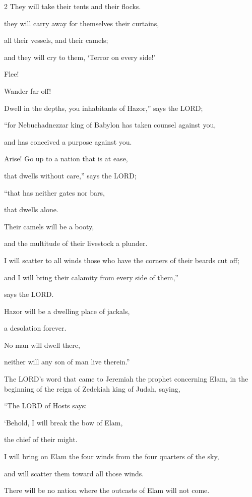\begin{multicols}{2}
\myverse{}They will take their tents and their flocks.

they will carry away for themselves their curtains,

all their vessels, and their camels;

and they will cry to them, ‘Terror on every side!’


\myverse{}Flee!

Wander far off!

Dwell in the depths, you inhabitants of Hazor,” says the LORD;

“for Nebuchadnezzar king of Babylon has taken counsel against you,

and has conceived a purpose against you.


\myverse{}Arise! Go up to a nation that is at ease,

that dwells without care,” says the LORD;

“that has neither gates nor bars,

that dwells alone.


\myverse{}Their camels will be a booty,

and the multitude of their livestock a plunder.

I will scatter to all winds those who have the corners of their beards cut off;

and I will bring their calamity from every side of them,”

says the LORD.


\myverse{}Hazor will be a dwelling place of jackals,

a desolation forever.

No man will dwell there,

neither will any son of man live therein.”

\vspace{\baselineskip}

\myverse{}The LORD’s word that came to Jeremiah the prophet concerning
Elam, in the beginning of the reign of Zedekiah king of Judah, saying,

\myverse{}“The LORD of Hosts says:

‘Behold, I will break the bow of Elam,

the chief of their might.


\myverse{}I will bring on Elam the four winds from the four quarters
of the sky,

and will scatter them toward all those winds.

There will be no nation where the outcasts of Elam will not come.



\end{multicols}
